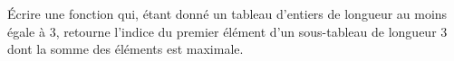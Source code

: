 Écrire une fonction qui, étant donné un tableau d'entiers de longueur au moins
égale à 3, retourne l'indice du premier élément d'un sous-tableau de longueur 3
dont la somme des éléments est maximale.